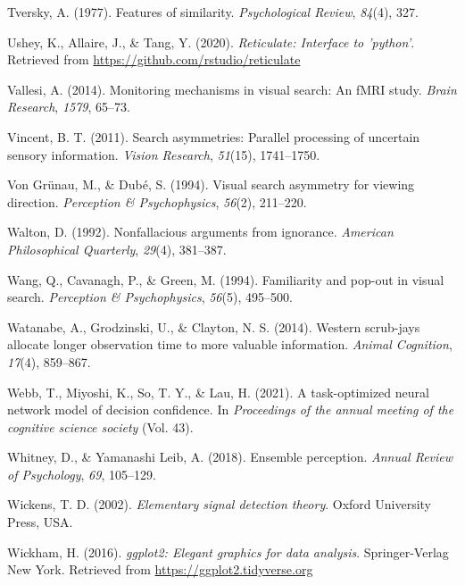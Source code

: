 \documentclass[12pt,twoside]{reedthesis}
\newenvironment{CSLReferences}%
  {}%
  {\par}
\begin{document}
\begin{CSLReferences}{1}{0}
\leavevmode\hypertarget{ref-tversky1977features}{}%
Tversky, A. (1977). Features of similarity. \emph{Psychological Review}, \emph{84}(4), 327.

\leavevmode\hypertarget{ref-R-reticulate}{}%
Ushey, K., Allaire, J., \& Tang, Y. (2020). \emph{Reticulate: Interface to 'python'}. Retrieved from \url{https://github.com/rstudio/reticulate}

\leavevmode\hypertarget{ref-vallesi2014monitoring}{}%
Vallesi, A. (2014). Monitoring mechanisms in visual search: An fMRI study. \emph{Brain Research}, \emph{1579}, 65--73.

\leavevmode\hypertarget{ref-vincent2011search}{}%
Vincent, B. T. (2011). Search asymmetries: Parallel processing of uncertain sensory information. \emph{Vision Research}, \emph{51}(15), 1741--1750.

\leavevmode\hypertarget{ref-von1994visual}{}%
Von Grünau, M., \& Dubé, S. (1994). Visual search asymmetry for viewing direction. \emph{Perception \& Psychophysics}, \emph{56}(2), 211--220.

\leavevmode\hypertarget{ref-walton1992nonfallacious}{}%
Walton, D. (1992). Nonfallacious arguments from ignorance. \emph{American Philosophical Quarterly}, \emph{29}(4), 381--387.

\leavevmode\hypertarget{ref-wang1994familiarity}{}%
Wang, Q., Cavanagh, P., \& Green, M. (1994). Familiarity and pop-out in visual search. \emph{Perception \& Psychophysics}, \emph{56}(5), 495--500.

\leavevmode\hypertarget{ref-watanabe2014western}{}%
Watanabe, A., Grodzinski, U., \& Clayton, N. S. (2014). Western scrub-jays allocate longer observation time to more valuable information. \emph{Animal Cognition}, \emph{17}(4), 859--867.

\leavevmode\hypertarget{ref-webb2021task}{}%
Webb, T., Miyoshi, K., So, T. Y., \& Lau, H. (2021). A task-optimized neural network model of decision confidence. In \emph{Proceedings of the annual meeting of the cognitive science society} (Vol. 43).

\leavevmode\hypertarget{ref-whitney2018ensemble}{}%
Whitney, D., \& Yamanashi Leib, A. (2018). Ensemble perception. \emph{Annual Review of Psychology}, \emph{69}, 105--129.

\leavevmode\hypertarget{ref-wickens2002elementary}{}%
Wickens, T. D. (2002). \emph{Elementary signal detection theory}. Oxford University Press, USA.

\leavevmode\hypertarget{ref-R-ggplot2}{}%
Wickham, H. (2016). \emph{ggplot2: Elegant graphics for data analysis}. Springer-Verlag New York. Retrieved from \url{https://ggplot2.tidyverse.org}


\end{CSLReferences}
\end{document}
